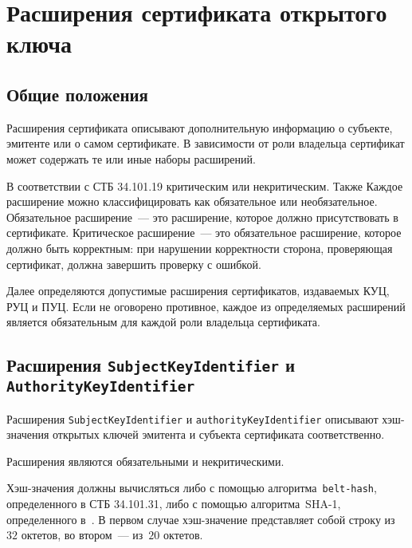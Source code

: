 \section{Расширения сертификата открытого ключа}\label{FMT.Ext}

\subsection{Общие положения}\label{FMT.Ext.Intro} 

Расширения сертификата описывают дополнительную информацию о субъекте,
эмитенте или о самом сертификате. В зависимости от роли владельца 
сертификат может содержать те или иные наборы расширений.

В соответствии с СТБ 34.101.19  критическим или некритическим. Также Каждое расширение 
можно классифицировать как обязательное или необязательное. Обязательное 
расширение~--- это расширение, которое должно присутствовать в 
сертификате.  Критическое расширение~--- это обязательное 
расширение, которое должно быть корректным: при нарушении корректности
сторона, проверяющая сертификат, должна завершить проверку с ошибкой.

Далее определяются допустимые расширения сертификатов, издаваемых КУЦ, РУЦ и ПУЦ. 
Если не оговорено противное, каждое из определяемых расширений является 
обязательным для каждой роли владельца сертификата. 


\subsection{Расширения \texttt{SubjectKeyIdentifier} и 
\texttt{AuthorityKeyIdentifier}}\label{FMT.Ext.SKID} 

Расширения \texttt{SubjectKeyIdentifier} и \texttt{authorityKeyIdentifier} 
описывают хэш-значения открытых ключей эмитента и субъекта сертификата 
соответственно. 

Расширения являются обязательными и некритическими.
 
Хэш-значения должны вычисляться либо с помощью алгоритма~\texttt{belt-hash}, 
определенного в СТБ 34.101.31, либо с помощью алгоритма~SHA-1,
определенного в~\cite{SHA1}. В первом случае хэш-значение 
представляет собой строку из~$32$ октетов, во втором~--- из~$20$ октетов.

